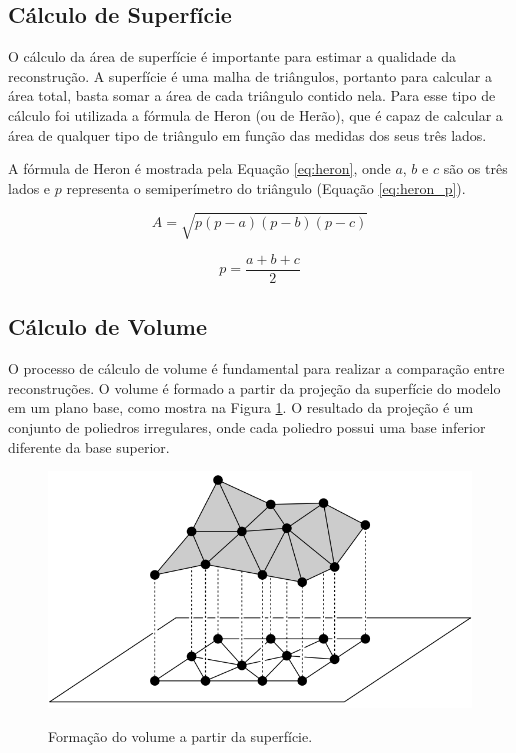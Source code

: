 \subsection{Cálculo de Superfície}
\label{sec:surface_calc}

O cálculo da área de superfície é importante para estimar a qualidade da reconstrução.
A superfície é uma malha de triângulos, portanto para calcular a área total, basta somar a área de cada triângulo contido nela. 
Para esse tipo de cálculo foi utilizada a fórmula de Heron (ou de Herão), que é capaz de calcular a área de qualquer tipo de triângulo em função das medidas dos seus três lados.

A fórmula de Heron é mostrada pela Equação \ref{eq:heron}, onde $a$, $b$ e $c$ são os três lados e $p$ representa o semiperímetro do triângulo (Equação \ref{eq:heron_p}).

\begin{equation}
    \label{eq:heron}
    A = \sqrt{p(p-a)(p-b)(p-c)}
\end{equation}

\begin{equation}
    \label{eq:heron_p}
    p = \frac{a+b+c}{2}
\end{equation}


\subsection{Cálculo de Volume}
\label{sec:volume_calc}

O processo de cálculo de volume é fundamental para realizar a comparação entre reconstruções.
O volume é formado a partir da projeção da superfície do modelo em um plano base, como mostra na Figura \ref{fig:prism}.
O resultado da projeção é um conjunto de poliedros irregulares, onde cada poliedro possui uma base inferior diferente da base superior.

\begin{figure}[H]
    \centering
    \caption{Formação do volume a partir da superfície.}
    \includegraphics[scale=0.5]{dados/figuras/prisms.png}
    \label{fig:prism}
\end{figure}

